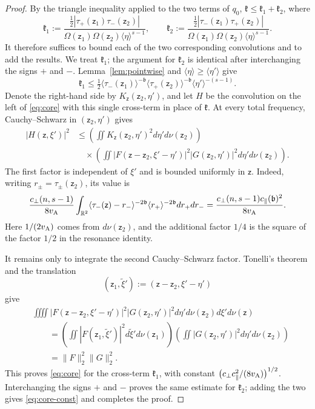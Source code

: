 \documentclass[11pt,reqno]{amsart}
\theoremstyle{plain}
\theoremstyle{definition}
\theoremstyle{remark}
\numberwithin{equation}{section}
\newcommand{\breg}{\mathfrak b}
\newcommand{\Real}{\mathbb R}
\begin{document}
\begin{proof}
By the triangle inequality applied to the two terms of $q_0$,
$\mathfrak k\le\mathfrak k_1+\mathfrak k_2$, where
\[
 \mathfrak k_1:=\frac{\frac12|\tau_+(\mathsf z_1)\tau_-(\mathsf z_2)|}
 {\Omega(\mathsf z_1)\Omega(\mathsf z_2)\langle\eta\rangle^{s-1}},
 \qquad
 \mathfrak k_2:=\frac{\frac12|\tau_-(\mathsf z_1)\tau_+(\mathsf z_2)|}
 {\Omega(\mathsf z_1)\Omega(\mathsf z_2)\langle\eta\rangle^{s-1}} .
\]
It therefore suffices to bound each of the two corresponding convolutions and to
add the results.  We treat $\mathfrak k_1$; the argument for $\mathfrak k_2$ is
identical after interchanging the signs $+$ and $-$.
Lemma~\ref{lem:pointwise} and
$\langle\eta\rangle\ge\langle\eta'\rangle$ give
\[
 \mathfrak k_1
 \le\tfrac12
 \langle\tau_-(\mathsf z_1)\rangle^{-\breg}
 \langle\tau_+(\mathsf z_2)\rangle^{-\breg}
 \langle\eta'\rangle^{-(s-1)}.
\]
Denote the right-hand side by
$K_{\mathsf z}(\mathsf z_2,\eta')$, and let $H$ be the convolution
on the left of \eqref{eq:core} with this single cross-term in place of
$\mathfrak k$.  At every total frequency, Cauchy--Schwarz in
$(\mathsf z_2,\eta')$ gives
\begin{align*}
 |H(\mathsf z,\xi')|^2
 &\le
 \left(\iint K_{\mathsf z}(\mathsf z_2,\eta')^2
        d\eta' d\nu(\mathsf z_2)\right)\\
 &\quad\times
 \left(\iint
 |F(\mathsf z-\mathsf z_2,\xi'-\eta')|^2
 |G(\mathsf z_2,\eta')|^2
  d\eta' d\nu(\mathsf z_2)\right).
\end{align*}
The first factor is independent of $\xi'$ and is bounded uniformly in
$\mathsf z$.  Indeed, writing
$r_\pm=\tau_\pm(\mathsf z_2)$, its value is
\[
 \frac{c_\perp(n,s-1)}{8v_{\rm A}}
 \int_{\Real^2}
 \langle\tau_-(\mathsf z)-r_-\rangle^{-2\breg}
 \langle r_+\rangle^{-2\breg} dr_+ dr_-
 =
 \frac{c_\perp(n,s-1)c_\parallel(\breg)^2}
 {8v_{\rm A}}.
\]
Here $1/(2v_{\rm A})$ comes from $d\nu(\mathsf z_2)$, and the additional
factor $1/4$ is the square of the factor $1/2$ in the resonance
identity.

It remains only to integrate the second Cauchy--Schwarz factor.  Tonelli's
theorem and the translation
\[
 (\mathsf z_1,\tilde\xi')
 :=(\mathsf z-\mathsf z_2,\xi'-\eta')
\]
give
\begin{align*}
 &\iiiint
 |F(\mathsf z-\mathsf z_2,\xi'-\eta')|^2
 |G(\mathsf z_2,\eta')|^2
  d\eta' d\nu(\mathsf z_2) d\xi' d\nu(\mathsf z)\\
 &\qquad=
 \left(\iint|F(\mathsf z_1,\tilde \xi')|^2
        d\tilde \xi' d\nu(\mathsf z_1)\right)
 \left(\iint|G(\mathsf z_2,\eta')|^2
        d\eta' d\nu(\mathsf z_2)\right)\\
 &\qquad=\|F\|_2^2\|G\|_2^2.
\end{align*}
This proves \eqref{eq:core} for the cross-term $\mathfrak k_1$, with constant
$\big(c_\perp c_\parallel^2/(8v_{\rm A})\big)^{1/2}$.  Interchanging the
signs $+$ and $-$ proves the same estimate for $\mathfrak k_2$; adding the two
gives \eqref{eq:core-const} and completes the proof.
\end{proof}
\end{document}
